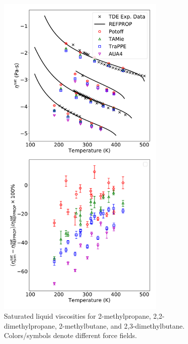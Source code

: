 \documentclass[preprint,review,12pt]{elsarticle}
\begin{document}
	\begin{figure}[htb!]
		\centering
		\includegraphics[width=3.2in]{compare_force_fields_short_branched.pdf}
		\caption{Saturated liquid viscosities for 2-methylpropane, 2,2-dimethylpropane, 2-methylbutane, and 2,3-dimethylbutane. Colors/symbols denote different force fields.}
		\label{fig:Saturation_short_branched}
	\end{figure} 
	
\end{document}
